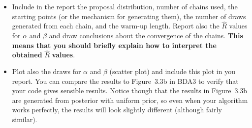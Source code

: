 \documentclass[a4paper,11pt]{article}
\begin{document}
\begin{itemize}
\item Include in the report the proposal distribution, number of chains used, the starting points (or the mechanism for generating them), the number of draws generated from each chain, and the warm-up length. Report also the $\hat R$ values for $\alpha$ and $\beta$ and draw conclusions about the convergence of the chains.
\textbf{This means that you should briefly explain how to interpret the obtained} $\hat R$ \textbf{values}.
\item Plot also the draws for $\alpha$ and $\beta$ (scatter plot) and include this plot in you report. You can compare the results to Figure~3.3b in BDA3 to verify that your code gives sensible results. Notice though that the results in Figure~3.3b are generated from posterior with uniform prior, so even when your algorithm works perfectly, the results will look slightly different (although fairly similar).
\end{itemize}
\end{document}
